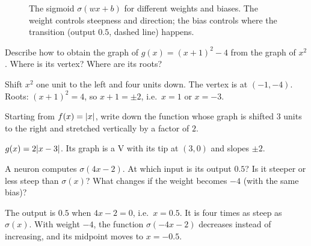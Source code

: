 \begin{figure}[htbp]
\centering
{}
\caption{The sigmoid $\sigma(wx + b)$ for different weights and biases. The
  weight controls steepness and direction; the bias controls where the
  transition (output $0.5$, dashed line) happens.}
\label{fig:sigmoid-family}
\end{figure}

\sectionexercises

\begin{exercise}
Describe how to obtain the graph of $g(x) = (x + 1)^2 - 4$ from the graph of
$x^2$. Where is its vertex? Where are its roots?
\end{exercise}
\begin{solution}
Shift $x^2$ one unit to the left and four units down. The vertex is at
$(-1, -4)$. Roots: $(x+1)^2 = 4$, so $x + 1 = \pm2$, i.e.\ $x = 1$ or $x = -3$.
\end{solution}

\begin{exercise}
Starting from $f(x) = \lvert x\rvert$, write down the function whose graph is shifted
$3$ units to the right and stretched vertically by a factor of $2$.
\end{exercise}
\begin{solution}
$g(x) = 2\lvert x - 3\rvert$. Its graph is a V with its tip at $(3, 0)$ and slopes
$\pm2$.
\end{solution}

\begin{exercise}
A neuron computes $\sigma(4x - 2)$. At which input is its output $0.5$? Is it
steeper or less steep than $\sigma(x)$? What changes if the weight becomes
$-4$ (with the same bias)?
\end{exercise}
\begin{solution}
The output is $0.5$ when $4x - 2 = 0$, i.e.\ $x = 0.5$. It is four times as
steep as $\sigma(x)$. With weight $-4$, the function $\sigma(-4x - 2)$
decreases instead of increasing, and its midpoint moves to $x = -0.5$.
\end{solution}

